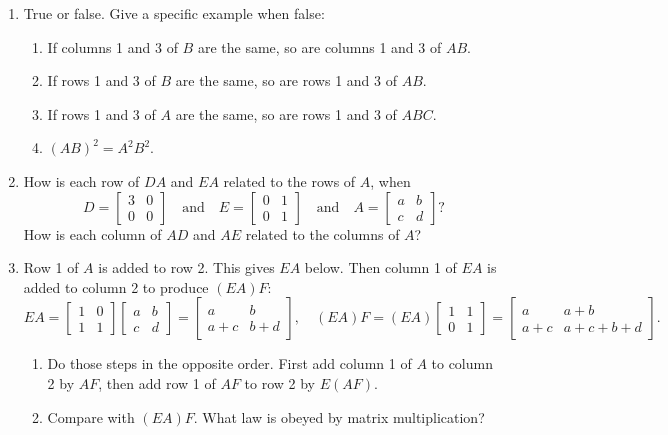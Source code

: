\documentclass[14pt, a4paper]{article}
\begin{document}
\begin{enumerate}
    \item True or false. Give a specific example when false:
          \begin{enumerate}
              \item If columns 1 and 3 of $B$ are the same, so are columns 1 and 3 of $AB$.
              \item If rows 1 and 3 of $B$ are the same, so are rows 1 and 3 of $AB$.
              \item If rows 1 and 3 of $A$ are the same, so are rows 1 and 3 of $ABC$.
              \item $(AB)^2 = A^2 B^2$.
          \end{enumerate}

    \item How is each row of $DA$ and $EA$ related to the rows of $A$, when
          \[
              D = \begin{bmatrix} 3 & 0 \\ 0 & 0 \end{bmatrix}
              \quad\text{and}\quad
              E = \begin{bmatrix} 0 & 1 \\ 0 & 1 \end{bmatrix}
              \quad\text{and}\quad
              A = \begin{bmatrix} a & b \\ c & d \end{bmatrix}?
          \]
          How is each column of $AD$ and $AE$ related to the columns of $A$?

    \item Row 1 of $A$ is added to row 2. This gives $EA$ below. Then column 1 of $EA$ is added to column 2 to produce $(EA)F$:
          \[
              EA = \begin{bmatrix} 1 & 0 \\ 1 & 1 \end{bmatrix}
              \begin{bmatrix} a & b \\ c & d \end{bmatrix}
              = \begin{bmatrix} a & b \\ a+c & b+d \end{bmatrix},
              \quad
              (EA)F = (EA)\begin{bmatrix} 1 & 1 \\ 0 & 1 \end{bmatrix}
              = \begin{bmatrix} a & a+b \\ a+c & a+c+b+d \end{bmatrix}.
          \]
          \begin{enumerate}
              \item Do those steps in the opposite order. First add column 1 of $A$ to column 2 by $AF$, then add row 1 of $AF$ to row 2 by $E(AF)$.
              \item Compare with $(EA)F$. What law is obeyed by matrix multiplication?
          \end{enumerate}


\end{enumerate}
\end{document}
